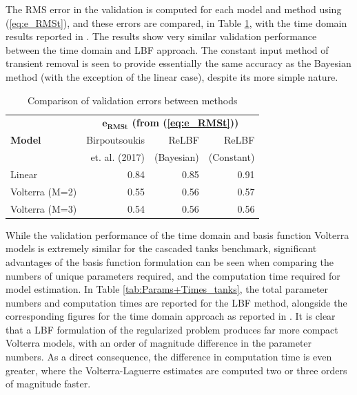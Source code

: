 The RMS error in the validation is computed for each model and method using (\ref{eq:e_RMSt}), and these errors are compared, in Table \ref{tab:eRMS_tanks}, with the time domain results reported in \cite{Birpoutsoukis2017b}. The results show very similar validation performance between the time domain and LBF approach. The constant input method of transient removal is seen to provide essentially the same accuracy as the Bayesian method (with the exception of the linear case), despite its more simple nature. 

\renewcommand{\arraystretch}{1.3}
\begin{table}[h]
\centering
\caption{Comparison of validation errors between methods}
\label{tab:eRMS_tanks}
\begin{tabular}{|l||r|r|r|}
\hline
                & \multicolumn{3}{c|}{\textbf{$\mathbf{e_{RMSt}}$ (from (\ref{eq:e_RMSt}))}} \\ \cline{2-4} 
\textbf{Model} & Birpoutsoukis           & ReLBF            & ReLBF                \\ 
		&  et. al. (2017) \cite{Birpoutsoukis2017b}          & (Bayesian)           & (Constant)                \\ \hline 
Linear         & 0.84              & 0.85             & 0.91                            \\ \hline
Volterra (M=2)         & 0.55               & 0.56             & 0.57                             \\ \hline
Volterra (M=3)           & 0.54              & 0.56             & 0.56                             \\ \hline
\end{tabular}
\end{table}

While the validation performance of the time domain and basis function Volterra models is extremely similar for the cascaded tanks benchmark, significant advantages of the basis function formulation can be seen when comparing the numbers of unique parameters required, and the computation time required for model estimation. In Table \ref{tab:Params+Times_tanks}, the total parameter numbers and computation times are reported for the LBF method, alongside the corresponding figures for the time domain approach as reported in \cite{Birpoutsoukis2017c}. It is clear that a LBF formulation of the regularized problem produces far more compact Volterra models, with an order of magnitude difference in the parameter numbers. As a direct consequence, the difference in computation time is even greater, where the Volterra-Laguerre estimates are computed two or three orders of magnitude faster.

